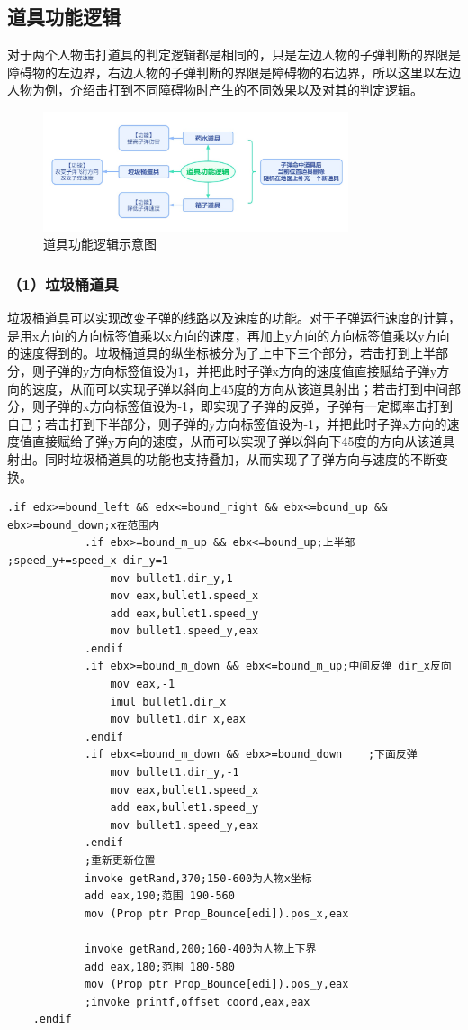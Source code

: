 \subsection{道具功能逻辑}
对于两个人物击打道具的判定逻辑都是相同的，只是左边人物的子弹判断的界限是障碍物的左边界，右边人物的子弹判断的界限是障碍物的右边界，所以这里以左边人物为例，介绍击打到不同障碍物时产生的不同效果以及对其的判定逻辑。
\begin{figure}[htbp]
    \vspace{13pt} %
    \centering
    \includegraphics[width=0.8\textwidth]{images/3-6.jpg}
    \caption{道具功能逻辑示意图}%
\end{figure}
\subsubsection{（1）垃圾桶道具}
垃圾桶道具可以实现改变子弹的线路以及速度的功能。对于子弹运行速度的计算，是用x方向的方向标签值乘以x方向的速度，再加上y方向的方向标签值乘以y方向的速度得到的。垃圾桶道具的纵坐标被分为了上中下三个部分，若击打到上半部分，则子弹的y方向标签值设为1，并把此时子弹x方向的速度值直接赋给子弹y方向的速度，从而可以实现子弹以斜向上45度的方向从该道具射出；若击打到中间部分，则子弹的x方向标签值设为-1，即实现了子弹的反弹，子弹有一定概率击打到自己；若击打到下半部分，则子弹的y方向标签值设为-1，并把此时子弹x方向的速度值直接赋给子弹y方向的速度，从而可以实现子弹以斜向下45度的方向从该道具射出。同时垃圾桶道具的功能也支持叠加，从而实现了子弹方向与速度的不断变换。
\begin{lstlisting}[language={[x86masm]Assembler}]
    .if edx>=bound_left && edx<=bound_right	&& ebx<=bound_up &&  ebx>=bound_down;x在范围内						
            .if ebx>=bound_m_up && ebx<=bound_up;上半部 ;speed_y+=speed_x dir_y=1
                mov bullet1.dir_y,1
                mov eax,bullet1.speed_x
                add eax,bullet1.speed_y
                mov bullet1.speed_y,eax
            .endif
            .if ebx>=bound_m_down && ebx<=bound_m_up;中间反弹 dir_x反向
                mov eax,-1
                imul bullet1.dir_x
                mov bullet1.dir_x,eax
            .endif
            .if ebx<=bound_m_down && ebx>=bound_down	;下面反弹
                mov bullet1.dir_y,-1
                mov eax,bullet1.speed_x
                add eax,bullet1.speed_y
                mov bullet1.speed_y,eax
            .endif		
            ;重新更新位置
            invoke getRand,370;150-600为人物x坐标
            add eax,190;范围 190-560
            mov (Prop ptr Prop_Bounce[edi]).pos_x,eax

            invoke getRand,200;160-400为人物上下界
            add eax,180;范围 180-580
            mov (Prop ptr Prop_Bounce[edi]).pos_y,eax
            ;invoke printf,offset coord,eax,eax			
    .endif
\end{lstlisting}
